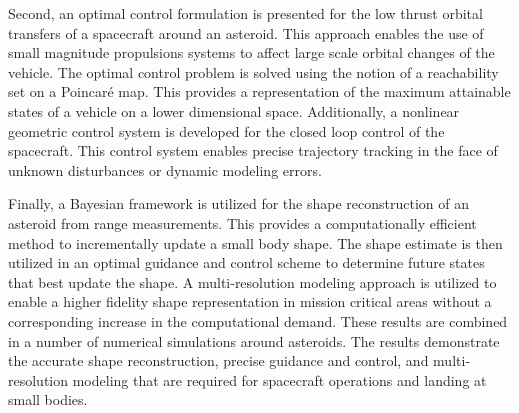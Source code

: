 \documentclass[letterpaper]{article}
\newcommand{\Poincare}{Poincar\'e }
\begin{document}
Second, an optimal control formulation is presented for the low thrust orbital transfers of a spacecraft around an asteroid. 
This approach enables the use of small magnitude propulsions systems to affect large scale orbital changes of the vehicle. 
The optimal control problem is solved using the notion of a reachability set on a \Poincare map.
This provides a representation of the maximum attainable states of a vehicle on a lower dimensional space.
Additionally, a nonlinear geometric control system is developed for the closed loop control of the spacecraft.
This control system enables precise trajectory tracking in the face of unknown disturbances or dynamic modeling errors. 

Finally, a Bayesian framework is utilized for the shape reconstruction of an asteroid from range measurements. 
This provides a computationally efficient method to incrementally update a small body shape. 
The shape estimate is then utilized in an optimal guidance and control scheme to determine future states that best update the shape.
A multi-resolution modeling approach is utilized to enable a higher fidelity shape representation in mission critical areas without a corresponding increase in the computational demand.
These results are combined in a number of numerical simulations around asteroids.
The results demonstrate the accurate shape reconstruction, precise guidance and control, and multi-resolution modeling that are required for spacecraft operations and landing at small bodies.
\end{document}
